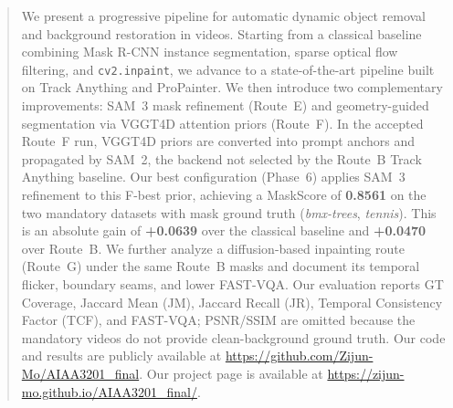 \begin{abstract}
We present a progressive pipeline for automatic dynamic object removal and background
restoration in videos. Starting from a classical baseline combining Mask R-CNN instance
segmentation, sparse optical flow filtering, and \texttt{cv2.inpaint}, we advance to a
state-of-the-art pipeline built on Track Anything and ProPainter. We then introduce two
complementary improvements: SAM~3 mask refinement (Route~E) and geometry-guided
segmentation via VGGT4D attention priors (Route~F). In the accepted Route~F run, VGGT4D
priors are converted into prompt anchors and propagated by SAM~2, the backend not selected
by the Route~B Track Anything baseline. Our best configuration (Phase~6) applies SAM~3
refinement to this F-best prior, achieving a MaskScore of \textbf{0.8561} on the two
mandatory datasets with mask ground truth (\emph{bmx-trees}, \emph{tennis}). This is an
absolute gain of \textbf{+0.0639} over the classical baseline and \textbf{+0.0470} over
Route~B. We further analyze a diffusion-based inpainting route (Route~G) under the same
Route~B masks and document its temporal flicker, boundary seams, and lower FAST-VQA. Our
evaluation reports GT Coverage, Jaccard Mean (JM), Jaccard Recall (JR), Temporal
Consistency Factor (TCF), and FAST-VQA; PSNR/SSIM are omitted because the mandatory
videos do not provide clean-background ground truth. Our code and results are publicly
available at \url{https://github.com/Zijun-Mo/AIAA3201_final}. Our project page is 
available at \url{https://zijun-mo.github.io/AIAA3201_final/}.
\end{abstract}
